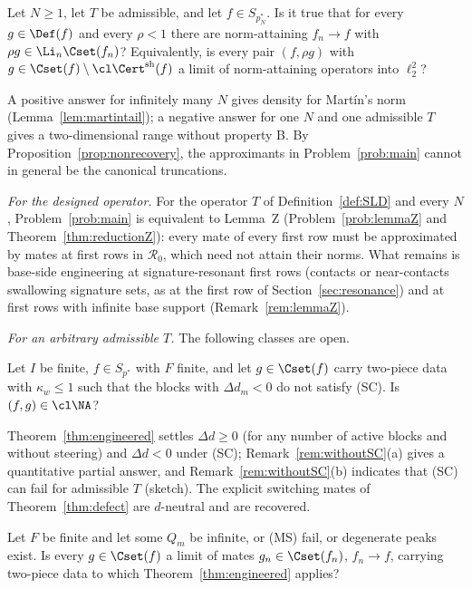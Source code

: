 \begin{problem}\label{prob:main}
Let $N\ge1$, let $T$ be admissible, and let $f\in S_{p_N^*}$.  Is it true
that for every $g\in\Def(f)$ and every $\rho<1$ there are norm-attaining
$f_n\to f$ with $\rho g\in\Li_n\Cset(f_n)$?  Equivalently, is every pair
$(f,\rho g)$ with $g\in\Cset(f)\setminus\cl\Cert^{\rm sh}(f)$ a limit of
norm-attaining operators into $\ell_2^2$?
\end{problem}

A positive answer for infinitely many $N$ gives density for Mart\'in's
norm (Lemma~\ref{lem:martintail}); a negative answer for one $N$ and one
admissible $T$ gives a two-dimensional range without property B.  By
Proposition~\ref{prop:nonrecovery}, the approximants in
Problem~\ref{prob:main} cannot in general be the canonical truncations.

\emph{For the designed operator.}  For the operator $T$ of
Definition~\ref{def:SLD} and every $N$, Problem~\ref{prob:main} is
equivalent to Lemma~Z (Problem~\ref{prob:lemmaZ} and
Theorem~\ref{thm:reductionZ}): every mate of every first row must be
approximated by mates at first rows in $\mathcal R_0$, which need not attain
their norms.  What remains is base-side engineering at signature-resonant
first rows (contacts or near-contacts swallowing signature sets, as at the
first row of Section~\ref{sec:resonance}) and at first rows with infinite
base support (Remark~\ref{rem:lemmaZ}).

\emph{For an arbitrary admissible $T$.}  The following classes are open.

\begin{problem}\label{prob:resonant}
Let $I$ be finite, $f\in S_{p^*}$ with $F$ finite, and let $g\in\Cset(f)$
carry two-piece data with $\kappa_w\le1$ such that the blocks with
$\Delta d_m<0$ do not satisfy \textup{(SC)}.  Is $(f,g)\in\cl\NA$?
\end{problem}

Theorem~\ref{thm:engineered} settles $\Delta d\ge0$ (for any number of
active blocks and without steering) and $\Delta d<0$ under \textup{(SC)};
Remark~\ref{rem:withoutSC}(a) gives a quantitative partial answer, and
Remark~\ref{rem:withoutSC}(b) indicates that \textup{(SC)} can fail for
admissible $T$ (sketch).  The explicit switching mates of
Theorem~\ref{thm:defect} are $d$-neutral and are recovered.

\begin{problem}\label{prob:generic}
Let $F$ be finite and let some $Q_m$ be infinite, or \textup{(MS)} fail, or
degenerate peaks exist.  Is every $g\in\Cset(f)$ a limit of mates
$g_n\in\Cset(f_n)$, $f_n\to f$, carrying two-piece data to which
Theorem~\ref{thm:engineered} applies?
\end{problem}


